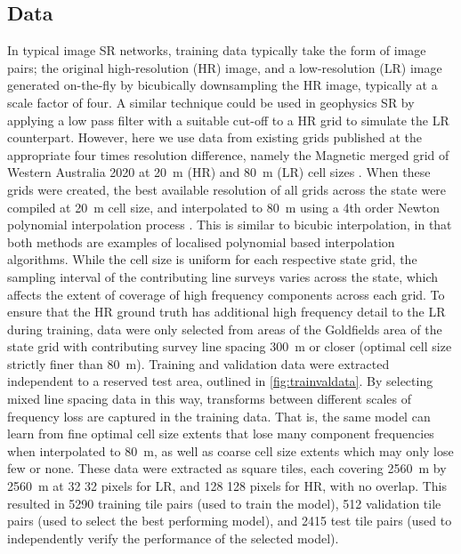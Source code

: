 \documentclass[manuscript.tex]{subfiles}
\begin{document}
\subsection{Data}
In typical image SR networks, training data typically take the form of image pairs; the original high-resolution (HR) image, and a low-resolution (LR) image generated on-the-fly by bicubically downsampling the HR image, typically at a scale factor of four.
A similar technique could be used in geophysics SR by applying a low pass filter with a suitable cut-off to a HR grid to simulate the LR counterpart.
However, here we use data from existing grids published at the appropriate four times resolution difference, namely the Magnetic merged grid of Western Australia 2020 at \SI{20}{\metre} (HR) and \SI{80}{\metre} (LR) cell sizes \parencite{brett80MagneticMerged2020}.
When these grids were created, the best available resolution of all grids across the state were compiled at \SI{20}{\metre} cell size, and interpolated to \SI{80}{\metre} using a 4th order Newton polynomial interpolation process \parencite[][personal communication]{brett80MagneticMerged2020}.
This is similar to bicubic interpolation, in that both methods are examples of localised polynomial based interpolation algorithms.
While the cell size is uniform for each respective state grid, the sampling interval of the contributing line surveys varies across the state, which affects the extent of coverage of high frequency components across each grid.
To ensure that the HR ground truth has additional high frequency detail to the LR during training, data were only selected from areas of the Goldfields area of the state grid with contributing survey line spacing \SI{300}{\metre} or closer (optimal cell size strictly finer than \SI{80}{\metre}).
Training and validation data were extracted independent to a reserved test area, outlined in \cref{fig:trainvaldata}.
By selecting mixed line spacing data in this way, transforms between different scales of frequency loss are captured in the training data.
That is, the same model can learn from fine optimal cell size extents that lose many component frequencies when interpolated to \SI{80}{\metre}, as well as coarse cell size extents which may only lose few or none.
These data were extracted as square tiles, each covering \SI{2560}{\metre} by \SI{2560}{\metre} at 32 \texttimes{} 32 pixels for LR, and 128 \texttimes{} 128 pixels for HR, with no overlap.
This resulted in \num{5290} training tile pairs (used to train the model), \num{512} validation tile pairs (used to select the best performing model), and \num{2415} test tile pairs (used to independently verify the performance of the selected model).
\end{document}
